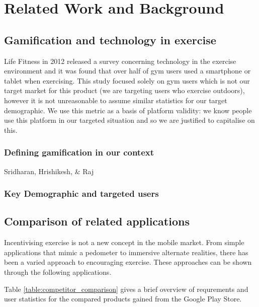 \chapter{Related Work and Background}\label{ch_background}

\section{Gamification and technology in exercise}

Life Fitness in 2012 released a survey concerning technology in the
exercise environment\cite{lifefitness} and it was found that over half of
gym users used a smartphone or tablet when exercising. This study
focused solely on gym users which is not our target market for this
product (we are targeting users who exercise outdoors), however it is
not unreasonable to assume similar statistics for our target
demographic. We use this metric as a basis of platform validity: we
know people use this platform in our targeted situation and so we are
justified to capitalise on this.

\subsection{Defining gamification in our context}
Sridharan, Hrishikesh, \& Raj\cite{academic_gamification}



\subsection{Key Demographic and targeted users}

\section{Comparison of related applications}\label{sec_comparison}
Incentivising exercise is not a new concept in the mobile market. From
simple applications that mimic a pedometer to immersive alternate
realities, there has been a varied approach to encouraging
exercise. These approaches can be shown through the following
applications. 

Table \ref{table:competitor_comparison} gives a brief
overview of requrements and user statistics for the compared products
gained from the Google Play Store.

